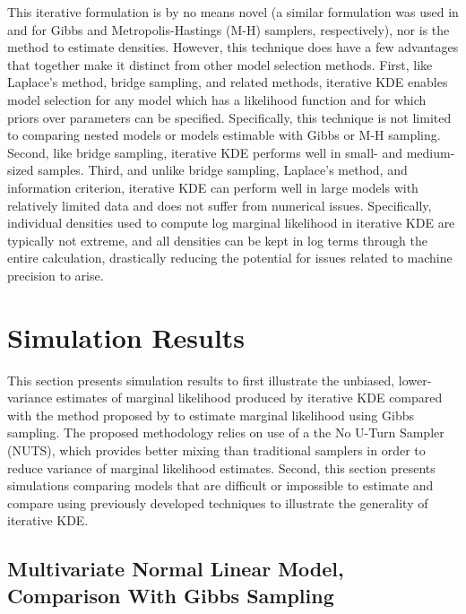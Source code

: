 \documentclass[twocolumn]{article}
\begin{document}
This iterative formulation is by no means novel (a similar formulation was used in \cite{Chib} and \cite{ChibJeliazkov} for Gibbs and Metropolis-Hastings (M-H) samplers, respectively), nor is the method to estimate densities. However, this technique does have a few advantages that together make it distinct from other model selection methods. First, like Laplace's method, bridge sampling, and related methods, iterative KDE enables model selection for any model which has a likelihood function and for which priors over parameters can be specified. Specifically, this technique is not limited to comparing nested models or models estimable with Gibbs or M-H sampling. Second, like bridge sampling, iterative KDE performs well in small- and medium-sized samples. Third, and unlike bridge sampling, Laplace's method, and information criterion, iterative KDE can perform well in large models with relatively limited data and does not suffer from numerical issues. Specifically, individual densities used to compute log marginal likelihood in iterative KDE are typically not extreme, and all densities can be kept in log terms through the entire calculation, drastically reducing the potential for issues related to machine precision to arise.

\section{Simulation Results}

This section presents simulation results to first illustrate the unbiased, lower-variance estimates of marginal likelihood produced by iterative KDE compared with the method proposed by \cite{Chib} to estimate marginal likelihood using Gibbs sampling. The proposed methodology relies on use of a the No U-Turn Sampler (NUTS), which provides better mixing than traditional samplers in order to reduce variance of marginal likelihood estimates. Second, this section presents simulations comparing models that are difficult or impossible to estimate and compare using previously developed techniques to illustrate the generality of iterative KDE.

\subsection{Multivariate Normal Linear Model, Comparison With Gibbs Sampling}


\end{document}
